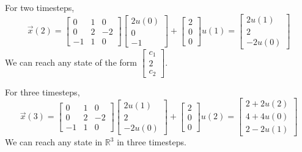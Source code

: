 {\begin{enumerate}
        For two timesteps,
        \[\vec{x}(2) = 
        \begin{bmatrix}
            0 & 1 & 0 \\
            0 & 2 & -2 \\
            -1 & 1 & 0
        \end{bmatrix} 
        \begin{bmatrix} 
            2u(0) \\ 0 \\ -1 
        \end{bmatrix}
        + \begin{bmatrix}
            2 \\ 0 \\ 0
        \end{bmatrix} u(1) =
        \begin{bmatrix} 
            2u(1) \\ 2 \\ -2u(0) 
        \end{bmatrix}\]
        We can reach any state of the form $\begin{bmatrix} c_1 \\ 2 \\ c_2 \end{bmatrix}$. \\
        \newline

        For three timesteps,
        \[\vec{x}(3) = 
        \begin{bmatrix}
            0 & 1 & 0 \\
            0 & 2 & -2 \\
            -1 & 1 & 0
        \end{bmatrix} 
        \begin{bmatrix} 
            2u(1) \\ 2 \\ -2u(0) 
        \end{bmatrix}
        + \begin{bmatrix}
            2 \\ 0 \\ 0
        \end{bmatrix} u(2) =
        \begin{bmatrix} 
            2 + 2u(2) \\ 4 + 4u(0) \\ 2 - 2u(1) 
        \end{bmatrix}\] 
        We can reach any state in $\mathbb{R}^3$ in three timesteps.


\end{enumerate}}
